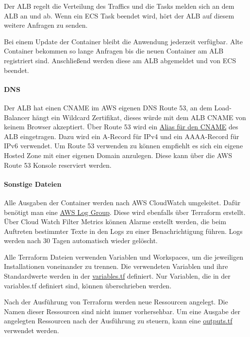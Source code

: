 Der ALB regelt die Verteilung des Traffics und die Tasks melden sich an dem ALB an und ab.
Wenn ein ECS Task beendet wird, hört der ALB auf diesem weitere Anfragen zu senden.

Bei einem Update der Container bleibt die Anwendung jederzeit verfügbar.
Alte Container bekommen so lange Anfragen bis die neuen Container am ALB registriert sind.
Anschließend werden diese am ALB abgemeldet und von ECS beendet.

\paragraph{DNS}

Der ALB hat einen CNAME im AWS eigenen DNS Route 53, an dem Load-Balancer hängt ein Wildcard Zertifikat, dieses würde mit dem ALB CNAME von keinem Browser akzeptiert.
Über Route 53 wird ein \hyperref[lst:terraform_dns]{Alias für den CNAME} des ALB eingetragen.
Dazu wird ein A-Record für IPv4 und ein AAAA-Record für IPv6 verwendet.
Um Route 53 verwenden zu können empfiehlt es sich ein eigene Hosted Zone mit einer eigenen Domain anzulegen.
Diese kann über die AWS Route 53 Konsole reserviert werden.

\paragraph{Sonstige Dateien}

Alle Ausgaben der Container werden nach AWS CloudWatch umgeleitet.
Dafür benötigt man eine \hyperref[lst:terraform_monitoring]{AWS Log Group}.
Diese wird ebenfalls über Terraform erstellt.
Über Cloud Watch Filter Metrics können Alarme erstellt werden, die beim Auftreten bestimmter Texte in den Logs zu einer Benachrichtigung führen.
Logs werden nach 30 Tagen automatisch wieder gelöscht.

Alle Terraform Dateien verwenden Variablen und Workspaces, um die jeweiligen Installationen voneinander zu trennen.
Die verwendeten Variablen und ihre Standardwerte werden in der \hyperref[lst:terraform_variables]{variables.tf} definiert.
Nur Variablen, die in der variables.tf definiert sind, können überschrieben werden.

Nach der Ausführung von Terraform werden neue Ressourcen angelegt.
Die Namen dieser Ressourcen sind nicht immer vorhersehbar.
Um eine Ausgabe der angelegten Ressourcen nach der Ausführung zu steuern, kann eine \hyperref[lst:terraform_output]{outputs.tf} verwendet werden.
